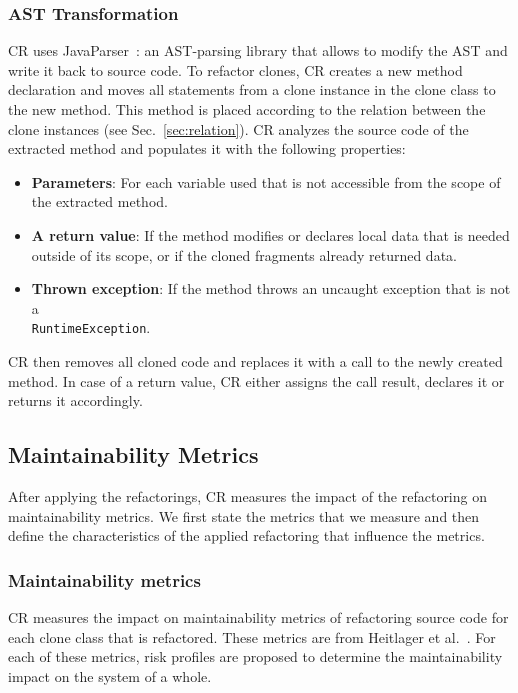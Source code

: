 \documentclass[a4paper,UKenglish,cleveref, autoref, thm-restate,authorcolumns]{lipics-v2019}
\begin{document}
\subsubsection{AST Transformation}
CR uses JavaParser~\cite{smith2017javaparser}: an AST-parsing library that allows to modify the AST and write it back to source code. To refactor clones, CR creates a new method declaration and moves all statements from a clone instance in the clone class to the new method. This method is placed according to the relation between the clone instances (see Sec.~\ref{sec:relation}). CR analyzes the source code of the extracted method and populates it with the following properties:
\begin{itemize}
  \item \textbf{Parameters}: For each variable used that is not accessible from the scope of the extracted method.
  \item \textbf{A return value}: If the method modifies or declares local data that is needed outside of its scope, or if the cloned fragments already returned data.
  \item \textbf{Thrown exception}: If the method throws an uncaught exception that is not a \\ \texttt{RuntimeException}.
\end{itemize}
CR then removes all cloned code and replaces it with a call to the newly created method. In case of a return value, CR either assigns the call result, declares it or returns it accordingly.

\subsection{Maintainability Metrics}
After applying the refactorings, CR measures the impact of the refactoring on maintainability metrics. We first state the metrics that we measure and then define the characteristics of the applied refactoring that influence the metrics.

\subsubsection{Maintainability metrics} \label{sec:metrics}
CR measures the impact on maintainability metrics of refactoring source code for each clone class that is refactored. These metrics are from Heitlager et al.~\cite{heitlager2007practical}. For each of these metrics, risk profiles are proposed to determine the maintainability impact on the system of a whole.
\end{document}
